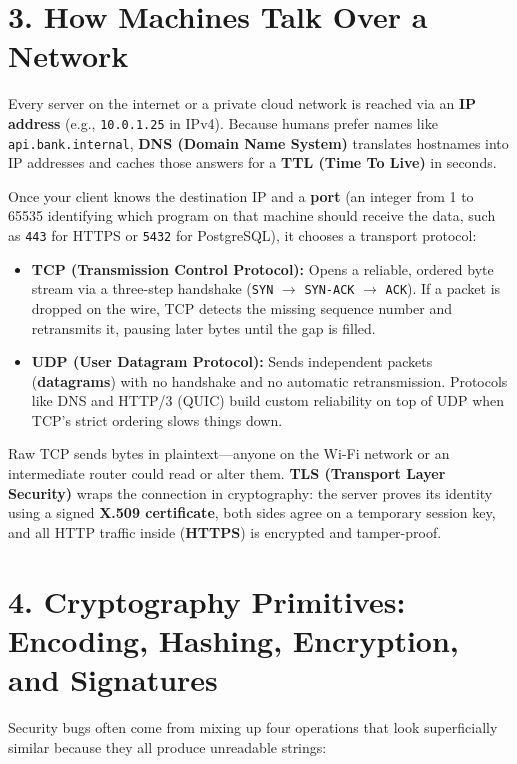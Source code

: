\section*{3. How Machines Talk Over a Network}
\label{sec:primer-network}

Every server on the internet or a private cloud network is reached via an \textbf{IP address} (e.g., \texttt{10.0.1.25} in IPv4). Because humans prefer names like \texttt{api.bank.internal}, \textbf{DNS (Domain Name System)} translates hostnames into IP addresses and caches those answers for a \textbf{TTL (Time To Live)} in seconds.

Once your client knows the destination IP and a \textbf{port} (an integer from 1 to 65535 identifying which program on that machine should receive the data, such as \texttt{443} for HTTPS or \texttt{5432} for PostgreSQL), it chooses a transport protocol:
\begin{itemize}[leftmargin=15pt]
  \item \textbf{TCP (Transmission Control Protocol):} Opens a reliable, ordered byte stream via a three-step handshake (\texttt{SYN} $\to$ \texttt{SYN-ACK} $\to$ \texttt{ACK}). If a packet is dropped on the wire, TCP detects the missing sequence number and retransmits it, pausing later bytes until the gap is filled.
  \item \textbf{UDP (User Datagram Protocol):} Sends independent packets (\textbf{datagrams}) with no handshake and no automatic retransmission. Protocols like DNS and HTTP/3 (QUIC) build custom reliability on top of UDP when TCP's strict ordering slows things down.
\end{itemize}

Raw TCP sends bytes in plaintext---anyone on the Wi-Fi network or an intermediate router could read or alter them. \textbf{TLS (Transport Layer Security)} wraps the connection in cryptography: the server proves its identity using a signed \textbf{X.509 certificate}, both sides agree on a temporary session key, and all HTTP traffic inside (\textbf{HTTPS}) is encrypted and tamper-proof.

\section*{4. Cryptography Primitives: Encoding, Hashing, Encryption, and Signatures}
\label{sec:primer-crypto}

Security bugs often come from mixing up four operations that look superficially similar because they all produce unreadable strings:

